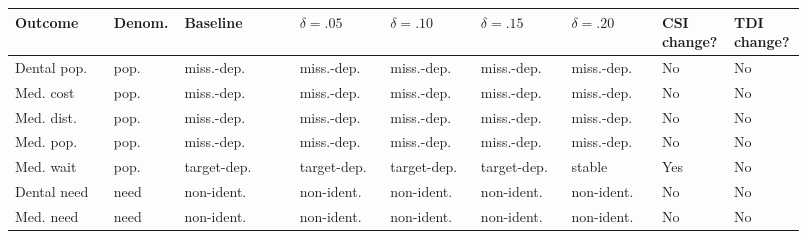 \begingroup
\scriptsize
\setlength{\tabcolsep}{3pt}
\begin{tabularx}{\linewidth}{@{}p{0.12\linewidth}p{0.06\linewidth}p{0.14\linewidth}p{0.11\linewidth}p{0.11\linewidth}p{0.11\linewidth}p{0.11\linewidth}p{0.08\linewidth}p{0.08\linewidth}@{}}
\toprule
Outcome & Denom. & Baseline & $\delta=.05$ & $\delta=.10$ & $\delta=.15$ & $\delta=.20$ & CSI change? & TDI change? \\
\midrule
Dental pop. & pop. & miss.-dep. & miss.-dep. & miss.-dep. & miss.-dep. & miss.-dep. & No & No \\
Med. cost & pop. & miss.-dep. & miss.-dep. & miss.-dep. & miss.-dep. & miss.-dep. & No & No \\
Med. dist. & pop. & miss.-dep. & miss.-dep. & miss.-dep. & miss.-dep. & miss.-dep. & No & No \\
Med. pop. & pop. & miss.-dep. & miss.-dep. & miss.-dep. & miss.-dep. & miss.-dep. & No & No \\
Med. wait & pop. & target-dep. & target-dep. & target-dep. & target-dep. & stable & Yes & No \\
Dental need & need & non-ident. & non-ident. & non-ident. & non-ident. & non-ident. & No & No \\
Med. need & need & non-ident. & non-ident. & non-ident. & non-ident. & non-ident. & No & No \\
\bottomrule
\end{tabularx}
\endgroup
